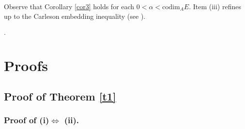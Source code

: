 \documentclass[12pt]{amsart} \setlength{\textwidth}{15cm} \setlength{\textheight}{24cm} \setlength{\voffset}{-1cm} \setlength{\oddsidemargin}{-0.4cm} \setlength{\evensidemargin}{-0.4cm}
\theoremstyle{definition}
\theoremstyle{remark}
\begin{document}
Observe that   Corollary \ref{cor3} holds for each
$0 < \alpha< \mathrm{codim}_A E$. Item (iii) refines  \cite[Theorem 2.10]{IV} up  to the Carleson embedding inequality (see \cite[p. 59, Lemma 5]{MC}).











 .


\section{Proofs}
\subsection{ Proof   of Theorem \ref{t1}}
 \subsubsection{Proof of (i)$\Leftrightarrow$ (ii). }
\end{document}
